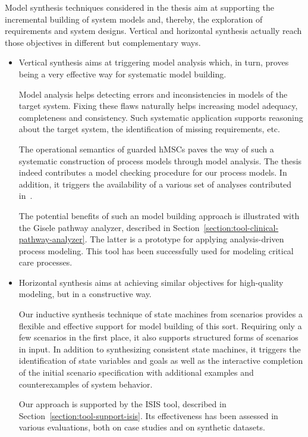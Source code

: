 Model synthesis techniques considered in the thesis aim at supporting the incremental building of system models and, thereby, the exploration of requirements and system designs. Vertical and horizontal synthesis actually reach those objectives in different but complementary ways.
\begin{itemize}

\item Vertical synthesis aims at triggering model analysis which, in turn, proves being a very effective way for systematic model building.

Model analysis helps detecting errors and inconsistencies in models of the target system. Fixing these flaws naturally helps increasing model adequacy, completeness and consistency. Such systematic application supports reasoning about the target system, the identification of missing requirements, etc.

The operational semantics of guarded hMSCs paves the way of such a systematic construction of process models through model analysis. The thesis indeed contributes a model checking procedure for our process models. In addition, it triggers the availability of a various set of analyses contributed in~\cite{Damas:2011}. 

The potential benefits of such an model building approach is illustrated with the Gisele pathway analyzer, described in Section~\ref{section:tool-clinical-pathway-analyzer}. The latter is a prototype for applying analysis-driven process modeling. This tool has been successfully used for modeling critical care processes.

\item Horizontal synthesis aims at achieving similar objectives for high-quality modeling, but in a constructive way.

Our inductive synthesis technique of state machines from scenarios provides a flexible and effective support for model building of this sort. Requiring only a few scenarios in the first place, it also supports structured forms of scenarios in input. In addition to synthesizing consistent state machines, it triggers the identification of state variables and goals as well as the interactive completion of the initial scenario specification with additional examples and counterexamples of system behavior.

Our approach is supported by the ISIS tool, described in Section~\ref{section:tool-support-isis}. Its effectiveness has been assessed in various evaluations, both on case studies and on synthetic datasets.

\end{itemize}

